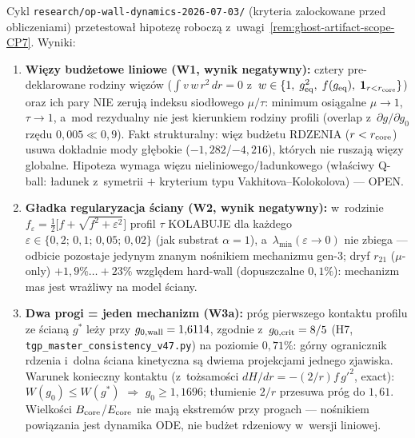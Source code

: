 \begin{remark}[Cykl \texttt{op-wall-dynamics} wykonany (2026-07-03):
  wersja liniowa hipotezy bud\.zetowej negatywna;
  $g_{0,\rm crit}=8/5$ jako pr\'og aktywacji \'sciany]%
\label{rem:wall-dynamics-2026-07-03}
Cykl \texttt{research/op-wall-dynamics-2026-07-03/} (kryteria
zalockowane przed obliczeniami) przetestowa\l{} hipotez\k{e}
robocz\k{a} z~uwagi~\ref{rem:ghost-artifact-scope-CP7}. Wyniki:
\begin{enumerate}[nosep]
  \item \textbf{Wi\k{e}zy bud\.zetowe liniowe (W1, wynik negatywny):}
    cztery pre-deklarowane rodziny wi\k{e}z\'ow
    ($\int v\,w\,r^2\,dr=0$ z~$w\in\{1,\;g_{\rm eq}^2,\;f(g_{\rm eq}),\;
    \mathbf{1}_{r<r_{\rm core}}\}$) oraz ich pary NIE zeruj\k{a}
    indeksu siod\l{}owego $\mu/\tau$: minimum osi\k{a}galne
    $\mu\to1$, $\tau\to1$, a~mod rezydualny nie jest kierunkiem
    rodziny profili (overlap z~$\partial g/\partial g_0$ rz\k{e}du
    $0{,}005\ll0{,}9$). Fakt strukturalny: wi\k{e}z bud\.zetu RDZENIA
    ($r<r_{\rm core}$) usuwa dok\l{}adnie mody g\l{}\k{e}bokie
    ($-1{,}282$/$-4{,}216$), kt\'orych nie ruszaj\k{a} wi\k{e}zy
    globalne. Hipoteza wymaga wi\k{e}zu
    nieliniowego/\l{}adunkowego (w\l{}a\'sciwy Q-ball:
    \l{}adunek z~symetrii $+$ kryterium typu Vakhitova--Kolokolova)
    --- OPEN.
  \item \textbf{G\l{}adka regularyzacja \'sciany (W2, wynik
    negatywny):} w~rodzinie
    $f_\varepsilon=\tfrac12\bigl[f+\sqrt{f^2+\varepsilon^2}\bigr]$
    profil $\tau$ KOLABUJE dla ka\.zdego
    $\varepsilon\in\{0{,}2;\,0{,}1;\,0{,}05;\,0{,}02\}$ (jak substrat
    $\alpha=1$), a~$\lambda_{\min}(\varepsilon\to0)$ nie zbiega ---
    odbicie pozostaje jedynym znanym no\'snikiem mechanizmu gen-3;
    dryf $r_{21}$ ($\mu$-only) $+1{,}9\%\dots+23\%$ wzgl\k{e}dem
    hard-wall (dopuszczalne $0{,}1\%$): mechanizm mas jest wra\.zliwy
    na model \'sciany.
  \item \textbf{Dwa progi = jeden mechanizm (W3a):} pr\'og pierwszego
    kontaktu profilu ze \'scian\k{a} $g^*$ le\.zy przy
    $g_{0,\rm wall}=1{,}6114$, zgodnie z~$g_{0,\rm crit}=8/5$ (H7,
    \texttt{tgp\_master\_consistency\_v47.py}) na poziomie
    $0{,}71\%$: g\'orny ogranicznik rdzenia i~dolna \'sciana
    kinetyczna s\k{a} dwiema projekcjami jednego zjawiska.
    Warunek konieczny kontaktu (z~to\.zsamo\'sci
    $dH/dr=-(2/r)f\,g'^2$, exact): $W(g_0)\le W(g^*)$
    $\Rightarrow$ $g_0\ge1{,}1696$; t\l{}umienie $2/r$ przesuwa
    pr\'og do $1{,}61$. Wielko\'sci $B_{\rm core}$/$E_{\rm core}$
    nie maj\k{a} ekstrem\'ow przy progach --- no\'snikiem
    powi\k{a}zania jest dynamika ODE, nie bud\.zet rdzeniowy
    w~wersji liniowej.
\end{enumerate}
\end{remark}

